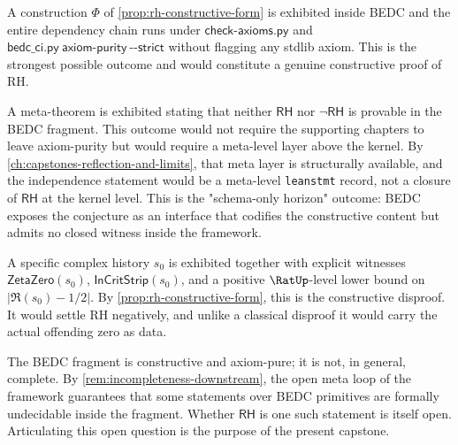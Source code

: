 \begin{remark}
\label{rem:rh-outcome-provable}
A construction $\Phi$ of \autoref{prop:rh-constructive-form} is exhibited inside BEDC and the entire dependency chain runs under $\mathsf{check\text{-}axioms.py}$ and $\mathsf{bedc\_ci.py\ axiom\text{-}purity\ \text{-}\text{-}strict}$ without flagging any stdlib axiom. This is the strongest possible outcome and would constitute a genuine constructive proof of RH.
\end{remark}

\begin{remark}
\label{rem:rh-outcome-independence}
A meta-theorem is exhibited stating that neither $\mathsf{RH}$ nor $\neg\mathsf{RH}$ is provable in the BEDC fragment. This outcome would not require the supporting chapters to leave axiom-purity but would require a meta-level layer above the kernel. By \autoref{ch:capstones-reflection-and-limits}, that meta layer is structurally available, and the independence statement would be a meta-level \texttt{leanstmt} record, not a closure of $\mathsf{RH}$ at the kernel level. This is the "schema-only horizon" outcome: BEDC exposes the conjecture as an interface that codifies the constructive content but admits no closed witness inside the framework.
\end{remark}

\begin{remark}
\label{rem:rh-outcome-counterexample}
A specific complex history $s_0$ is exhibited together with explicit witnesses $\mathsf{ZetaZero}(s_0)$, $\mathsf{InCritStrip}(s_0)$, and a positive $\RatUp$-level lower bound on $|\Re(s_0) - 1/2|$. By \autoref{prop:rh-constructive-form}, this is the constructive disproof. It would settle RH negatively, and unlike a classical disproof it would carry the actual offending zero as data.
\end{remark}

\begin{remark}
\label{rem:rh-fragment-undecided}
The BEDC fragment is constructive and axiom-pure; it is not, in general, complete. By \autoref{rem:incompleteness-downstream}, the open meta loop of the framework guarantees that some statements over BEDC primitives are formally undecidable inside the fragment. Whether $\mathsf{RH}$ is one such statement is itself open. Articulating this open question is the purpose of the present capstone.
\end{remark}

